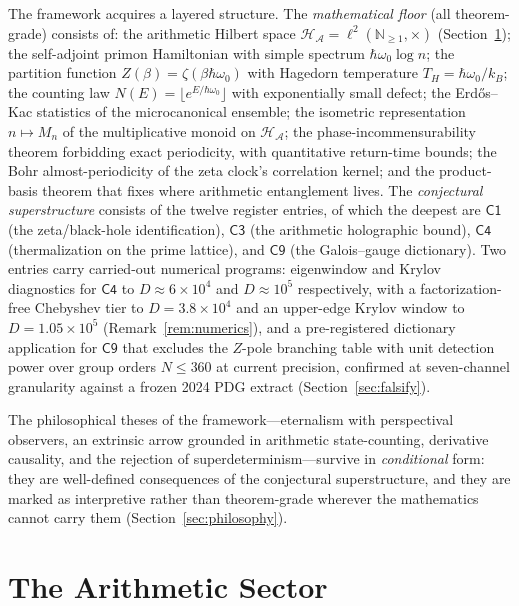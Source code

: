 \documentclass[11pt,a4paper]{article}
\theoremstyle{plain}
\theoremstyle{definition}
\theoremstyle{remark}
\newcommand{\Nn}{\mathbb{N}}
\newcommand{\Hil}{\mathcal{H}}
\begin{document}
The framework acquires a layered structure. The \emph{mathematical floor} (all theorem-grade)
consists of: the arithmetic Hilbert space $\Hil_{\mathcal{A}}=\ell^{2}(\Nn_{\geq1},\times)$
(Section~\ref{sec:arithmetic}); the self-adjoint primon Hamiltonian with simple spectrum
$\hbar\omega_{0}\log n$; the partition function $Z(\beta)=\zeta(\beta\hbar\omega_{0})$ with
Hagedorn temperature $T_{H}=\hbar\omega_{0}/k_{B}$; the counting law
$N(E)=\lfloor e^{E/\hbar\omega_{0}}\rfloor$ with exponentially small defect; the Erd\H{o}s--Kac
statistics of the microcanonical ensemble; the isometric representation $n\mapsto M_{n}$ of
the multiplicative monoid on $\Hil_{\mathcal{A}}$; the phase-incommensurability theorem forbidding
exact periodicity, with quantitative return-time bounds; the Bohr almost-periodicity of the
zeta clock's correlation kernel; and the product-basis theorem that fixes where arithmetic
entanglement lives. The \emph{conjectural superstructure} consists of the
twelve register entries, of which the deepest are $\mathsf{C1}$ (the zeta/black-hole
identification), $\mathsf{C3}$ (the arithmetic holographic bound), $\mathsf{C4}$ (thermalization
on the prime lattice), and $\mathsf{C9}$ (the Galois--gauge dictionary). Two entries carry
carried-out numerical programs: eigenwindow and Krylov diagnostics for $\mathsf{C4}$ to
$D\approx6\times10^{4}$ and $D\approx10^{5}$ respectively, with a factorization-free
Chebyshev tier to $D=3.8\times10^{4}$ and an upper-edge Krylov window to
$D=1.05\times10^{5}$ (Remark~\ref{rem:numerics}), and a
pre-registered dictionary application for $\mathsf{C9}$ that excludes the $Z$-pole branching table
with unit detection power over group orders $N\leq360$ at current precision, confirmed at
seven-channel granularity against a frozen 2024 PDG extract (Section~\ref{sec:falsify}).

The philosophical theses of the framework---eternalism with perspectival observers, an extrinsic
arrow grounded in arithmetic state-counting, derivative causality, and the rejection of
superdeterminism---survive in \emph{conditional} form: they are well-defined consequences of the
conjectural superstructure, and they are marked as interpretive rather than theorem-grade
wherever the mathematics cannot carry them (Section~\ref{sec:philosophy}).

\section{The Arithmetic Sector}\label{sec:arithmetic}
\end{document}

